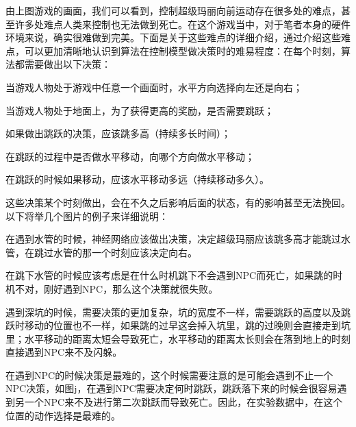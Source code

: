 由上图游戏的画面，我们可以看到，控制超级玛丽向前运动存在很多处的难点，甚至许多处难点人类来控制也无法做到死亡。在这个游戏当中，对于笔者本身的硬件环境来说，确实很难做到完美。下面是关于这些难点的详细介绍，通过介绍这些难点，可以更加清晰地认识到算法在控制模型做决策时的难易程度：在每个时刻，算法都需要做出以下决策：
\begin{enumerate*}
  \item 当游戏人物处于游戏中任意一个画面时，水平方向选择向左还是向右；
  \item 当游戏人物处于地面上，为了获得更高的奖励，是否需要跳跃；
  \item 如果做出跳跃的决策，应该跳多高（持续多长时间）；
  \item 在跳跃的过程中是否做水平移动，向哪个方向做水平移动；
  \item 在跳跃的时候如果移动，应该水平移动多远（持续移动多久）。
\end{enumerate*}
这些决策某个时刻做出，会在不久之后影响后面的状态，有的影响甚至无法挽回。以下将举几个图片的例子来详细说明：
\begin{exmp}[遇到水管]
  在遇到水管的时候，神经网络应该做出决策，决定超级玛丽应该跳多高才能跳过水管，在跳过水管的那一个时刻应该决定向右。
\end{exmp}
\begin{exmp}[跳下水管]
  在跳下水管的时候应该考虑是在什么时机跳下不会遇到NPC而死亡，如果跳的时机不对，刚好遇到NPC，那么这个决策就很失败。
\end{exmp}
\begin{exmp}[遇到深坑]
  遇到深坑的时候，需要决策的更加复杂，坑的宽度不一样，需要跳跃的高度以及跳跃时移动的位置也不一样，如果跳的过早这会掉入坑里，跳的过晚则会直接走到坑里；水平移动的距离太短会导致死亡，水平移动的距离太长则会在落到地上的时刻直接遇到NPC来不及闪躲。
\end{exmp}
\begin{exmp}[遇到NPC]
  在遇到NPC的时候决策是最难的，这个时候需要注意的是可能会遇到不止一个NPC决策，如图j，在遇到NPC需要决定何时跳跃，跳跃落下来的时候会很容易遇到另一个NPC来不及进行第二次跳跃而导致死亡。因此，在实验数据中，在这个位置的动作选择是最难的。
\end{exmp}

